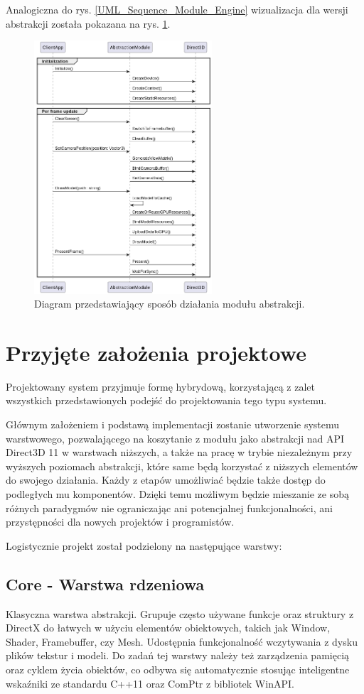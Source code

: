 Analogiczna do rys. \ref{UML_Sequence_Module_Engine} wizualizacja dla wersji abstrakcji została pokazana na rys. \ref{UML_Sequence_Module_Abstraction}.

\begin{figure}[ht!]
	\centering
	\includegraphics[width=250px]{uml/module_type_abstraction.png}
	\caption{Diagram przedstawiający sposób działania modułu abstrakcji.}
	\label{UML_Sequence_Module_Abstraction}
\end{figure}

\section{Przyjęte założenia projektowe}
Projektowany system przyjmuje formę hybrydową, korzystającą z zalet wszystkich przedstawionych podejść do projektowania tego typu systemu. 

Głównym założeniem i podstawą implementacji zostanie utworzenie systemu warstwowego, pozwalającego na koszytanie z modułu jako abstrakcji nad API Direct3D 11 w warstwach niższych, a także na pracę w trybie niezależnym przy wyższych poziomach abstrakcji, które same będą korzystać z niższych elementów do swojego działania. Każdy z etapów umożliwiać będzie także dostęp do podległych mu komponentów. Dzięki temu możliwym będzie mieszanie ze sobą różnych paradygmów nie ograniczając ani potencjalnej funkcjonalności, ani przystępności dla nowych projektów i programistów.

Logistycznie projekt został podzielony na następujące warstwy:

\subsection{\textbf{Core} - Warstwa rdzeniowa}
Klasyczna warstwa abstrakcji. Grupuje często używane funkcje oraz struktury z DirectX do łatwych w użyciu elementów obiektowych, takich jak Window, Shader, Framebuffer, czy Mesh. Udostępnia funkcjonalność wczytywania z dysku plików tekstur i modeli. Do zadań tej warstwy należy też zarządzenia pamięcią oraz cyklem życia obiektów, co odbywa się automatycznie stosując inteligentne wskaźniki ze standardu C++11 oraz ComPtr z bibliotek WinAPI.

